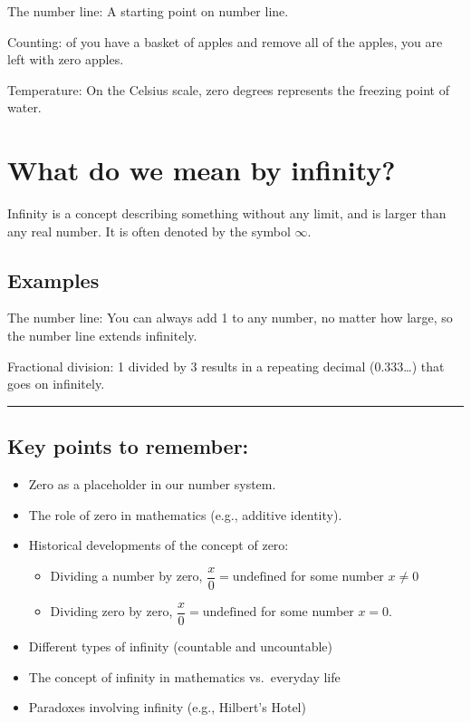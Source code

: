 \documentclass[
  letterpaper,
  DIV=11,
  numbers=noendperiod]{scrartcl}
\begin{document}
The number line: A starting point on number line.

Counting: of you have a basket of apples and remove all of the apples,
you are left with zero apples.

Temperature: On the Celsius scale, zero degrees represents the freezing
point of water.

\section{What do we mean by
infinity?}\label{what-do-we-mean-by-infinity}

Infinity is a concept describing something without any limit, and is
larger than any real number. It is often denoted by the symbol
\(\infty\).

\subsection{Examples}\label{examples-1}

The number line: You can always add 1 to any number, no matter how
large, so the number line extends infinitely.

Fractional division: 1 divided by 3 results in a repeating decimal
(0.333\ldots) that goes on infinitely.

\begin{center}\rule{0.5\linewidth}{0.5pt}\end{center}

\subsection{Key points to remember:}\label{key-points-to-remember}

\begin{itemize}
\item
  Zero as a placeholder in our number system.
\item
  The role of zero in mathematics (e.g., additive identity).
\item
  Historical developments of the concept of zero:

  \begin{itemize}
  \item
    Dividing a number by zero, \(\dfrac{x}{0} = \text{undefined}\) for
    some number \(x \neq 0\)
  \item
    Dividing zero by zero, \(\dfrac{x}{0} = \text{undefined}\) for some
    number \(x = 0\).
  \end{itemize}
\item
  Different types of infinity (countable and uncountable)
\item
  The concept of infinity in mathematics vs.~everyday life
\item
  Paradoxes involving infinity (e.g., Hilbert's Hotel)
\end{itemize}
\end{document}
